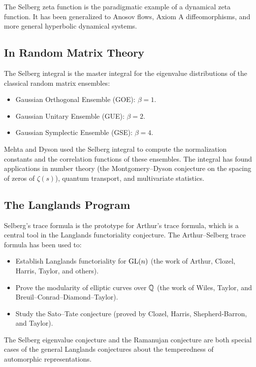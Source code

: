 The Selberg zeta function is the paradigmatic example of a dynamical zeta function. It has been generalized to Anosov flows, Axiom A diffeomorphisms, and more general hyperbolic dynamical systems.

\subsection{In Random Matrix Theory}

The Selberg integral is the master integral for the eigenvalue distributions of the classical random matrix ensembles:
\begin{itemize}
    \item Gaussian Orthogonal Ensemble (GOE): \(\beta = 1\).
    \item Gaussian Unitary Ensemble (GUE): \(\beta = 2\).
    \item Gaussian Symplectic Ensemble (GSE): \(\beta = 4\).
\end{itemize}

Mehta and Dyson used the Selberg integral to compute the normalization constants and the correlation functions of these ensembles. The integral has found applications in number theory (the Montgomery--Dyson conjecture on the spacing of zeros of \(\zeta(s)\)), quantum transport, and multivariate statistics.

\subsection{The Langlands Program}

Selberg's trace formula is the prototype for Arthur's trace formula, which is a central tool in the Langlands functoriality conjecture. The Arthur--Selberg trace formula has been used to:
\begin{itemize}
    \item Establish Langlands functoriality for \(\operatorname{GL}(n)\) (the work of Arthur, Clozel, Harris, Taylor, and others).
    \item Prove the modularity of elliptic curves over \(\mathbb{Q}\) (the work of Wiles, Taylor, and Breuil--Conrad--Diamond--Taylor).
    \item Study the Sato--Tate conjecture (proved by Clozel, Harris, Shepherd-Barron, and Taylor).
\end{itemize}

The Selberg eigenvalue conjecture and the Ramanujan conjecture are both special cases of the general Langlands conjectures about the temperedness of automorphic representations.

